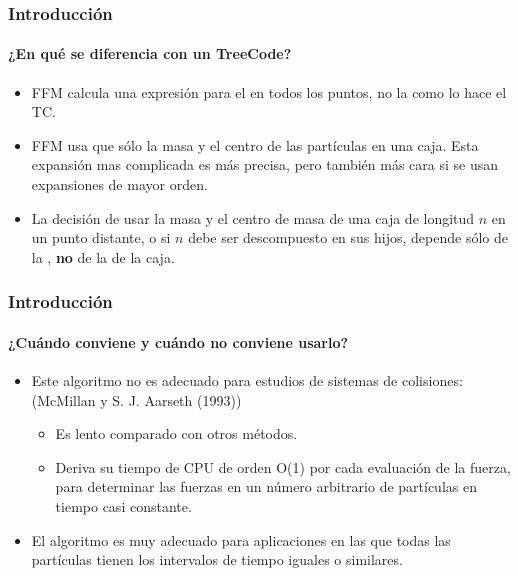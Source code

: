 \begin{frame}
    \frametitle{Introducción}
    \framesubtitle{¿En qué se diferencia con un TreeCode?}

    \begin{itemize}
        \item<1-> FFM calcula una expresión para el  en todos los puntos, no la  como lo hace el TC.
        \item<2-> FFM usa  que sólo la masa y el centro de las partículas en una caja.
                  Esta expansión mas complicada es más precisa, pero también más cara si se usan expansiones de mayor orden.
        \item<3-> La decisión de usar la masa y el centro de masa de una caja de longitud $n$ en un punto distante,
                  o si $n$ debe ser descompuesto en sus hijos, depende sólo de la ,
                  \textbf{no} de la  de la caja.
    \end{itemize}
\end{frame}


\begin{frame}
    \frametitle{Introducción}
    \framesubtitle{¿Cuándo conviene y cuándo no conviene usarlo?}

    \begin{itemize}
        \item<1-> Este algoritmo no es adecuado para estudios de sistemas de colisiones: (McMillan y S. J. Aarseth (1993))
        \begin{itemize}
            \item Es lento comparado con otros métodos.
            \item Deriva su tiempo de CPU de orden O(1) por cada evaluación de la fuerza, para determinar las fuerzas en un número arbitrario de partículas en tiempo casi constante.
        \end{itemize}
        \item<2-> El algoritmo es muy adecuado para aplicaciones en las que todas las partículas tienen los intervalos de tiempo iguales o similares.
    \end{itemize}
\end{frame}


